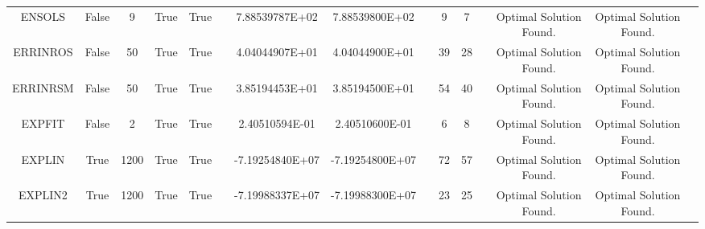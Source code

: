 \begin{longtable}{ccccccccccccccc}
	\cellcolor{default2} ENSOLS& \cellcolor{default2} False& \cellcolor{default2} 9& \cellcolor{default2} True& \cellcolor{default2} True& \cellcolor{header} & \cellcolor{best} 7.88539787E+02& \cellcolor{ok} 7.88539800E+02& \cellcolor{header} & \cellcolor{ok} 9& \cellcolor{best} 7& \cellcolor{header} & \cellcolor{default2} Optimal Solution Found.& \cellcolor{default2} Optimal Solution Found.& \cellcolor{header} \\
	\cellcolor{default1} ERRINROS& \cellcolor{default1} False& \cellcolor{default1} 50& \cellcolor{default1} True& \cellcolor{default1} True& \cellcolor{header} & \cellcolor{ok} 4.04044907E+01& \cellcolor{best} 4.04044900E+01& \cellcolor{header} & \cellcolor{ok} 39& \cellcolor{best} 28& \cellcolor{header} & \cellcolor{default1} Optimal Solution Found.& \cellcolor{default1} Optimal Solution Found.& \cellcolor{header} \\
	\cellcolor{default2} ERRINRSM& \cellcolor{default2} False& \cellcolor{default2} 50& \cellcolor{default2} True& \cellcolor{default2} True& \cellcolor{header} & \cellcolor{best} 3.85194453E+01& \cellcolor{ok} 3.85194500E+01& \cellcolor{header} & \cellcolor{ok} 54& \cellcolor{best} 40& \cellcolor{header} & \cellcolor{default2} Optimal Solution Found.& \cellcolor{default2} Optimal Solution Found.& \cellcolor{header} \\
	\cellcolor{default1} EXPFIT& \cellcolor{default1} False& \cellcolor{default1} 2& \cellcolor{default1} True& \cellcolor{default1} True& \cellcolor{header} & \cellcolor{best} 2.40510594E-01& \cellcolor{ok} 2.40510600E-01& \cellcolor{header} & \cellcolor{best} 6& \cellcolor{ok} 8& \cellcolor{header} & \cellcolor{default1} Optimal Solution Found.& \cellcolor{default1} Optimal Solution Found.& \cellcolor{header} \\
	\cellcolor{default2} EXPLIN& \cellcolor{default2} True& \cellcolor{default2} 1200& \cellcolor{default2} True& \cellcolor{default2} True& \cellcolor{header} & \cellcolor{best} -7.19254840E+07& \cellcolor{ok} -7.19254800E+07& \cellcolor{header} & \cellcolor{ok} 72& \cellcolor{best} 57& \cellcolor{header} & \cellcolor{default2} Optimal Solution Found.& \cellcolor{default2} Optimal Solution Found.& \cellcolor{header} \\
	\cellcolor{default1} EXPLIN2& \cellcolor{default1} True& \cellcolor{default1} 1200& \cellcolor{default1} True& \cellcolor{default1} True& \cellcolor{header} & \cellcolor{best} -7.19988337E+07& \cellcolor{ok} -7.19988300E+07& \cellcolor{header} & \cellcolor{best} 23& \cellcolor{ok} 25& \cellcolor{header} & \cellcolor{default1} Optimal Solution Found.& \cellcolor{default1} Optimal Solution Found.& \cellcolor{header} \\

\end{longtable}
